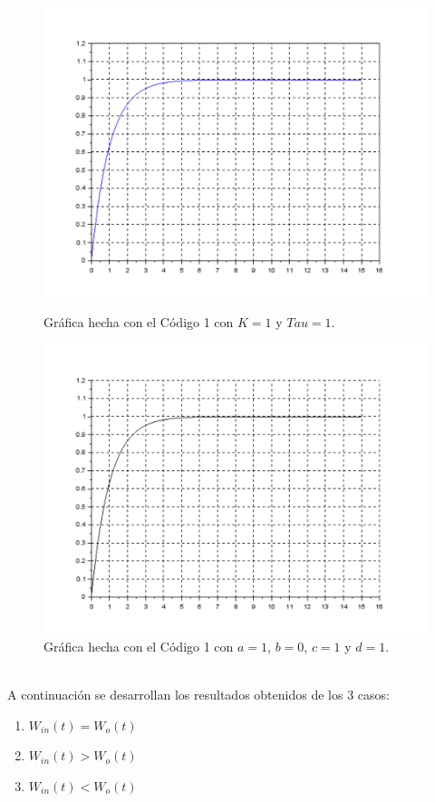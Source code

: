 \documentclass[12pt,a4paper]{article}
\begin{document}
\begin{figure}[h!]
\begin{minipage}{8cm} 
\centering
\includegraphics[scale=0.4]{Comparacion_profe.pdf}
\caption{Gráfica hecha con el Código 1 con $K = 1$ y $Tau = 1$.}
\label{Figura3}
\end{minipage}
\hspace{0.5cm}
\begin{minipage}{8cm}
\centering
\includegraphics[scale=0.4]{Comparacion_yo.pdf}
\caption{Gráfica hecha con el Código 1 con $a = 1$, $b = 0$, $c = 1$ y $d = 1$.}
\label{Figura4}
\end{minipage}
\end{figure}\\
A continuación se desarrollan los resultados obtenidos de los 3 casos:
\begin{enumerate}[$\cdot$]
\item $W_{in}(t) = W_{o}(t)$
\item $W_{in}(t) > W_{o}(t)$
\item $W_{in}(t) < W_{o}(t)$
\end{enumerate}
\end{document}
